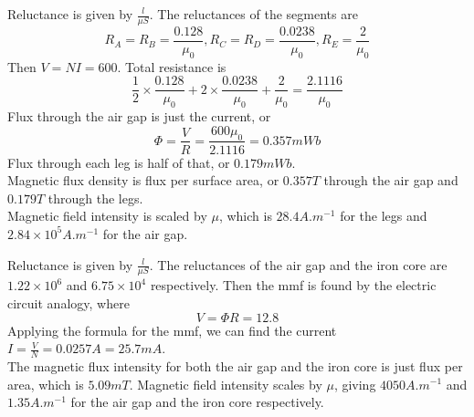 \documentclass[answers]{exam}
\begin{document}
\begin{questions}

\begin{solution}
    Reluctance is given by $\frac{l}{\mu S}$. The reluctances of the segments are
    $$R_A = R_B = \frac{0.128}{\mu_0}, R_C = R_D = \frac{0.0238}{\mu_0}, R_E = \frac{2}{\mu_0}$$
    Then $V=NI=600$. Total resistance is
    $$\frac{1}{2} \times \frac{0.128}{\mu_0} + 2 \times \frac{0.0238}{\mu_0} + \frac{2}{\mu_0} = \frac{2.1116}{\mu_0}$$
    Flux through the air gap is just the current, or
    $$\Phi = \frac{V}{R} = \frac{600\mu_0}{2.1116} = 0.357\unit{mWb}$$
    Flux through each leg is half of that, or $0.179\unit{mWb}$. \\
    Magnetic flux density is flux per surface area, or $0.357\unit{T}$ through the air gap and $0.179\unit{T}$ through the legs. \\
    Magnetic field intensity is scaled by $\mu$, which is $28.4\unit{A.m^{-1}}$ for the legs and $2.84\times10^5\unit{A.m^{-1}}$ for the air gap.
\end{solution}


\begin{solution}
    Reluctance is given by $\frac{l}{\mu S}$. The reluctances of the air gap and the iron core are $1.22\times10^6$ and $6.75\times10^4$ respectively. Then the mmf is found by the electric circuit analogy, where
    $$V = \Phi R = 12.8$$
    Applying the formula for the mmf, we can find the current $I = \frac{V}{N} = 0.0257\unit{A} = 25.7\unit{mA}$. \\
    The magnetic flux intensity for both the air gap and the iron core is just flux per area, which is $5.09\unit{mT}$. Magnetic field intensity scales by $\mu$, giving $4050\unit{A.m^{-1}}$ and $1.35\unit{A.m^{-1}}$ for the air gap and the iron core respectively.
\end{solution}

\end{questions}
\end{document}
